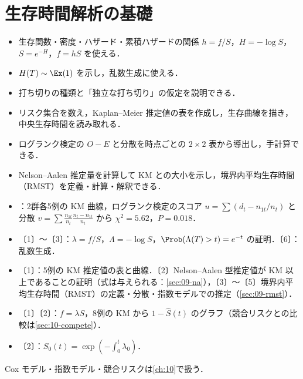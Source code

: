 \chapter{生存時間解析の基礎}\label{ch:09}

\begin{goalbox}
\begin{itemize}
\item 生存関数・密度・ハザード・累積ハザードの関係 $h=f/S$，$H=-\log S$，$S=e^{-H}$，$f=hS$ を使える．
\item $H(T)\sim\Ex(1)$ を示し，乱数生成に使える．
\item 打ち切りの種類と「独立な打ち切り」の仮定を説明できる．
\item リスク集合を数え，Kaplan--Meier 推定値の表を作成し，生存曲線を描き，中央生存時間を読み取れる．
\item ログランク検定の $O-E$ と分散を時点ごとの $2\times2$ 表から導出し，手計算できる．
\item Nelson--Aalen 推定量を計算して KM との大小を示し，境界内平均生存時間（RMST）を定義・計算・解釈できる．
\end{itemize}
\end{goalbox}

\begin{exambox}
\begin{itemize}
\item {}：2群各5例の KM 曲線，ログランク検定のスコア $u=\sum(d_t-n_{1t}/n_t)$ と分散 $v=\sum\frac{n_{1t}}{n_t}\frac{n_t-n_{1t}}{n_t}$ から $\chi^2=5.62$，$P=0.018$．
\item {}〔1〕〜〔3〕：$\lambda=f/S$，$\Lambda=-\log S$，$\Prob(\Lambda(T)>t)=e^{-t}$ の証明．〔6〕：乱数生成．
\item {}〔1〕：5例の KM 推定値の表と曲線．〔2〕Nelson--Aalen 型推定値が KM 以上であることの証明（式は与えられる：\cref{sec:09-na}），〔3〕〜〔5〕境界内平均生存時間（RMST）の定義・分散・指数モデルでの推定（\cref{sec:09-rmst}）．
\item {}〔1〕〔2〕：$f=\lambda S$，8例の KM から $1-\hat S(t)$ のグラフ（競合リスクとの比較は\cref{sec:10-compete}）．
\item {}〔2〕：$S_0(t)=\exp(-\int_0^t\lambda_0)$．
\end{itemize}
Cox モデル・指数モデル・競合リスクは\cref{ch:10}で扱う．
\end{exambox}


